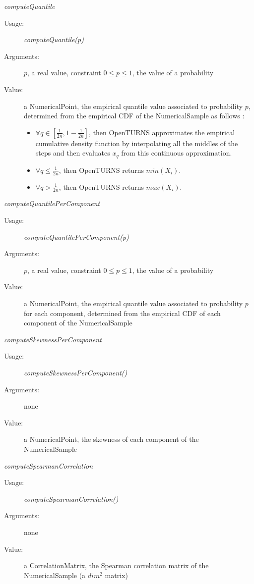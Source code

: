 \begin{description}
\begin{description}
\item \textit{computeQuantile}
\begin{description}
\item[Usage:] \textit{computeQuantile(p)}
\item[Arguments:] $p$, a real value, constraint $0\leq p \leq 1$, the value of a probability
\item[Value:] a NumericalPoint, the empirical quantile value associated to probability $p$, determined from the empirical CDF of the NumericalSample as follows : \begin{itemize}
\item $\forall q \in [\frac{1}{2n}, 1-\frac{1}{2n}]$, then OpenTURNS approximates the empirical  cumulative density function by interpolating all the middles of the steps and then evaluates  $x_q$ from this continuous approximation.
\item $\forall q \leq \frac{1}{2n}$, then OpenTURNS returns $min(X_i)$.
\item $\forall q > \frac{1}{2n}$, then OpenTURNS returns $max(X_i)$.
\end{itemize}

\end{description}
\bigskip

\item \textit{computeQuantilePerComponent}
\begin{description}
\item[Usage:] \textit{computeQuantilePerComponent(p)}
\item[Arguments:] $p$, a real value, constraint $0\leq p \leq 1$, the value of a probability
\item[Value:] a NumericalPoint,
the empirical quantile value associated to probability $p$ for each component, determined from the empirical CDF of each component of the NumericalSample
\end{description}
\bigskip

\item \textit{computeSkewnessPerComponent}
\begin{description}
\item[Usage:] \textit{computeSkewnessPerComponent()}
\item[Arguments:] none
\item[Value:] a NumericalPoint,  the skewness of each component of the NumericalSample
\end{description}
\bigskip

\item \textit{computeSpearmanCorrelation}
\begin{description}
\item[Usage:] \textit{computeSpearmanCorrelation()}
\item[Arguments:] none
\item[Value:] a CorrelationMatrix, the Spearman correlation matrix of the NumericalSample (a $dim^2$ matrix)
\end{description}
\bigskip


\end{description}
\end{description}
